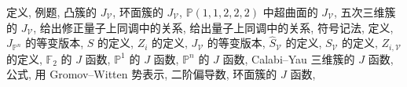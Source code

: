 \begin{theindex}
\subsubitem \leavevmode\hypertarget{idx:0403}{定义},\enspace{}
\subsubitem \leavevmode\hypertarget{idx:0404}{例题},\enspace{}
\subsubitem \leavevmode\hypertarget{idx:0405}{凸簇的 $J_{\mathcal V}$},\enspace{}
\subsubitem \leavevmode\hypertarget{idx:0406}{环面簇的 $J_{\mathcal V}$},\enspace{}
\subsubitem \leavevmode\hypertarget{idx:0407}{$\mathbb P(1,1,2,2,2)$ 中超曲面的 $J_{\mathcal V}$},\enspace{}
\subsubitem \leavevmode\hypertarget{idx:0408}{五次三维簇的 $J_{\mathcal V}$},\enspace{}
\subsubitem \leavevmode\hypertarget{idx:0409}{给出修正量子上同调中的关系},\enspace{}
\subsubitem \leavevmode\hypertarget{idx:0410}{给出量子上同调中的关系},\enspace{}
\subsubitem \leavevmode\hypertarget{idx:0411}{符号记法},\enspace{}
\subitem \leavevmode\hypertarget{idx:0412}{定义},\enspace{}
\subitem \leavevmode\hypertarget{idx:0413}{$J_{\mathbb P^n}$ 的等变版本},\enspace{}
\subsubitem \leavevmode\hypertarget{idx:0414}{$S$ 的定义},\enspace{}
\subsubitem \leavevmode\hypertarget{idx:0415}{$Z_i$ 的定义},\enspace{}
\subitem \leavevmode\hypertarget{idx:0416}{$J_{\mathcal V}$ 的等变版本},\enspace{}
\subsubitem \leavevmode\hypertarget{idx:0417}{$\widehat S_{\mathcal V}$ 的定义},\enspace{}
\subsubitem \leavevmode\hypertarget{idx:0418}{$S_{\mathcal V}$ 的定义},\enspace{}
\subsubitem \leavevmode\hypertarget{idx:0419}{$Z_{i,\mathcal V}$ 的定义},\enspace{}
\subitem \leavevmode\hypertarget{idx:0420}{$\mathbb F_2$ 的 $J$ 函数},\enspace{}
\subitem \leavevmode\hypertarget{idx:0421}{$\mathbb P^1$ 的 $J$ 函数},\enspace{}
\subitem \leavevmode\hypertarget{idx:0422}{$\mathbb P^n$ 的 $J$ 函数},\enspace{}
\subitem \leavevmode\hypertarget{idx:0423}{Calabi--Yau 三维簇的 $J$ 函数},\enspace{}
\subsubitem \leavevmode\hypertarget{idx:0424}{公式},\enspace{}
\subsubitem \leavevmode\hypertarget{idx:0425}{用 Gromov--Witten 势表示},\enspace{}
\subsubitem \leavevmode\hypertarget{idx:0426}{二阶偏导数},\enspace{}
\subitem \leavevmode\hypertarget{idx:0427}{环面簇的 $J$ 函数},\enspace{}

\end{theindex}
